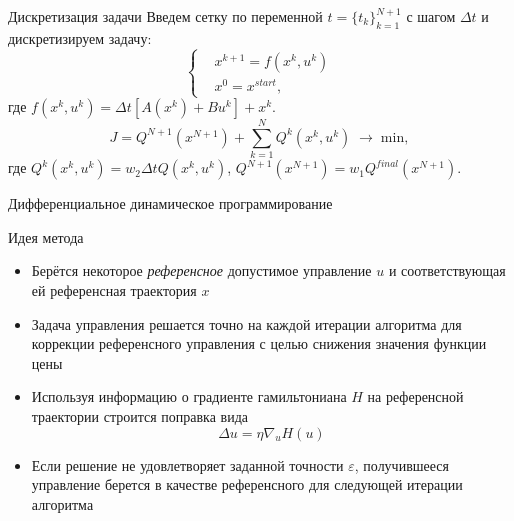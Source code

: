\documentclass[16pt]{beamer}
\begin{document}
    \begin{frame}{Дискретизация задачи}
        Введем сетку по переменной $t = \{t_k\}_{k = 1}^{N+1}$ с шагом $\Delta t$ и дискретизируем задачу:
        $$
            \left\{
            \begin{aligned}
            &x^{k+1} = f(x^k, u^k) \\
            &x^0 = x^{start},
            \end{aligned}
            \right.
        $$
        где $f(x^k, u^k) = \Delta t [A(x^k) + Bu^k] + x^k$.
        $$
            J = Q^{N+1}(x^{N+1}) + \sum_{k=1}^{N} Q^{k}(x^k, u^k)\;\longrightarrow\;\mathrm{min},
        $$
        где $Q^{k}(x^k, u^k) = w_2 \Delta t Q(x^k, u^k)$, $Q^{N+1}(x^{N+1}) = w_1Q^{final}(x^{N+1})$.
    \end{frame}

    \begin{frame}{Дифференциальное динамическое программирование}
        \begin{block}{Идея метода}
            \begin{itemize}
                \item Берётся некоторое \textit{референсное} допустимое управление $u$ и соответствующая ей референсная траектория $x$
                \item Задача управления решается точно на каждой итерации алгоритма для коррекции референсного управления с целью снижения значения функции цены
                \item Используя информацию о градиенте гамильтониана $H$ на референсной траектории строится поправка вида
                $$
                    \Delta u = \eta \nabla_u H(u)
                $$
                \item Если решение не удовлетворяет заданной точности $\varepsilon$, получившееся управление берется в качестве референсного для следующей итерации алгоритма 
            \end{itemize}
        \end{block}
    \end{frame}
\end{document}
